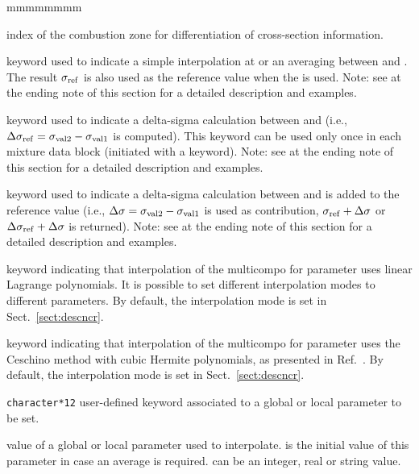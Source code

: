 \begin{ListeDeDescription}{mmmmmmmm}
\item[\dusa{ivarty}] index of the combustion zone for differentiation of cross-section information.

\item[\moc{SET}] keyword used to indicate a simple interpolation at  or an averaging between  and . The result $\sigma_{\rm ref}$ is also used as the reference value when the  is used. Note: see at the ending note of this section for a detailed description and examples.

\item[\moc{DELTA}] keyword used to indicate a delta-sigma calculation between  and 
(i.e., $\Delta\sigma_{\rm ref}=\sigma_{\rm val2}-\sigma_{\rm val1}$ is computed). This keyword can be used only once in each mixture data block (initiated
with a  keyword).  Note: see at the ending note of this section for a detailed description and examples.

\item[\moc{ADD}] keyword used to indicate a delta-sigma calculation between  and  is added to the reference value
(i.e., $\Delta\sigma=\sigma_{\rm val2}-\sigma_{\rm val1}$ is used as contribution, $\sigma_{\rm ref}+\Delta\sigma$ or $\Delta\sigma_{\rm ref}+\Delta\sigma$ is returned). Note: see at the ending note of this section for a detailed description and examples.

\item[\moc{LINEAR}] keyword indicating that interpolation of the {\sc multicompo} for parameter  uses linear Lagrange
polynomials. It is possible to set different interpolation modes to different parameters. By default, the interpolation mode is set in Sect.~\ref{sect:descncr}.

\item[\moc{CUBIC}] keyword indicating that interpolation of the {\sc multicompo} for parameter  uses the Ceschino method
with cubic Hermite polynomials, as presented in Ref.~. By default, the interpolation mode is set in Sect.~\ref{sect:descncr}.

\item[\dusa{PARKEY}] {\tt character*12} user-defined keyword associated to a global
or local parameter to be set.

\item[\dusa{val1}] value of a global or local parameter used to interpolate.   is the initial value of this parameter in case an average is required.  can be an integer, real or string value.


\end{ListeDeDescription}

